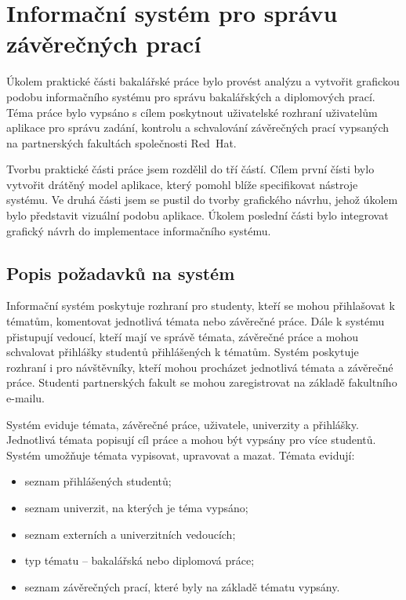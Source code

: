 \chapter{Informační systém pro správu závěrečných prací}

Úkolem praktické části bakalářské práce bylo provést analýzu a vytvořit grafickou podobu informačního systému pro správu bakalářských a diplomových prací. Téma práce bylo vypsáno s cílem poskytnout uživatelské rozhraní uživatelům aplikace pro správu zadání, kontrolu a schvalování závěrečných prací vypsaných na partnerských fakultách společnosti Red~Hat.

Tvorbu praktické části práce jsem rozdělil do tří částí. Cílem první čísti bylo vytvořit drátěný model aplikace, který pomohl blíže specifikovat nástroje systému. Ve druhá části jsem se pustil do tvorby grafického návrhu, jehož úkolem bylo představit vizuální podobu aplikace. Úkolem poslední části bylo integrovat grafický návrh do implementace informačního systému.

\section{Popis požadavků na systém}

Informační systém poskytuje rozhraní pro studenty, kteří se mohou přihlašovat k tématům, komentovat jednotlivá témata nebo závěrečné práce. Dále k systému přistupují vedoucí, kteří mají ve správě témata, závěrečné práce a mohou schvalovat přihlášky studentů přihlášených k tématům. Systém poskytuje rozhraní i pro návštěvníky, kteří mohou procházet jednotlivá témata a závěrečné práce. Studenti partnerských fakult se mohou zaregistrovat na základě fakultního e-mailu.

Systém eviduje témata, závěrečné práce, uživatele, univerzity a přihlášky. Jednotlivá témata popisují cíl práce a mohou být vypsány pro více studentů. Systém umožňuje témata vypisovat, upravovat a mazat. Témata evidují:

\begin{itemize}
    \item seznam přihlášených studentů;
    \item seznam univerzit, na kterých je téma vypsáno;
    \item seznam externích a univerzitních vedoucích;
    \item typ tématu -- bakalářská nebo diplomová práce;
    \item seznam závěrečných prací, které byly na základě tématu vypsány.
\end{itemize}

